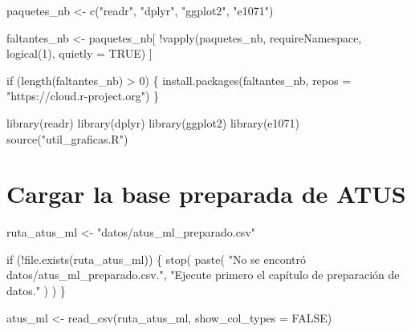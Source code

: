 \documentclass[
  spanish,
  10.5pt,
  letterpaper,
  openany,
  headings=big]{scrbook}
\newenvironment{Shaded}{}{}
\newcommand{\AttributeTok}[1]{\textcolor[rgb]{0.84,0.23,0.29}{#1}}
\newcommand{\ConstantTok}[1]{\textcolor[rgb]{0.00,0.36,0.77}{#1}}
\newcommand{\ControlFlowTok}[1]{\textcolor[rgb]{0.84,0.23,0.29}{#1}}
\newcommand{\DecValTok}[1]{\textcolor[rgb]{0.00,0.36,0.77}{#1}}
\newcommand{\FunctionTok}[1]{\textcolor[rgb]{0.44,0.26,0.76}{#1}}
\newcommand{\NormalTok}[1]{\textcolor[rgb]{0.14,0.16,0.18}{#1}}
\newcommand{\OtherTok}[1]{\textcolor[rgb]{0.44,0.26,0.76}{#1}}
\newcommand{\SpecialCharTok}[1]{\textcolor[rgb]{0.00,0.36,0.77}{#1}}
\newcommand{\StringTok}[1]{\textcolor[rgb]{0.01,0.18,0.38}{#1}}
\begin{document}
\begin{Shaded}
\begin{Highlighting}[]
\NormalTok{paquetes\_nb }\OtherTok{\textless{}{-}} \FunctionTok{c}\NormalTok{(}\StringTok{"readr"}\NormalTok{, }\StringTok{"dplyr"}\NormalTok{, }\StringTok{"ggplot2"}\NormalTok{, }\StringTok{"e1071"}\NormalTok{)}

\NormalTok{faltantes\_nb }\OtherTok{\textless{}{-}}\NormalTok{ paquetes\_nb[}
  \SpecialCharTok{!}\FunctionTok{vapply}\NormalTok{(paquetes\_nb, requireNamespace, }\FunctionTok{logical}\NormalTok{(}\DecValTok{1}\NormalTok{), }\AttributeTok{quietly =} \ConstantTok{TRUE}\NormalTok{)}
\NormalTok{]}

\ControlFlowTok{if}\NormalTok{ (}\FunctionTok{length}\NormalTok{(faltantes\_nb) }\SpecialCharTok{\textgreater{}} \DecValTok{0}\NormalTok{) \{}
  \FunctionTok{install.packages}\NormalTok{(faltantes\_nb, }\AttributeTok{repos =} \StringTok{"https://cloud.r{-}project.org"}\NormalTok{)}
\NormalTok{\}}

\FunctionTok{library}\NormalTok{(readr)}
\FunctionTok{library}\NormalTok{(dplyr)}
\FunctionTok{library}\NormalTok{(ggplot2)}
\FunctionTok{library}\NormalTok{(e1071)}
\FunctionTok{source}\NormalTok{(}\StringTok{"util\_graficas.R"}\NormalTok{)}
\end{Highlighting}
\end{Shaded}

\section{Cargar la base preparada de
ATUS}\label{cargar-la-base-preparada-de-atus}

\begin{Shaded}
\begin{Highlighting}[]
\NormalTok{ruta\_atus\_ml }\OtherTok{\textless{}{-}} \StringTok{"datos/atus\_ml\_preparado.csv"}

\ControlFlowTok{if}\NormalTok{ (}\SpecialCharTok{!}\FunctionTok{file.exists}\NormalTok{(ruta\_atus\_ml)) \{}
  \FunctionTok{stop}\NormalTok{(}
    \FunctionTok{paste}\NormalTok{(}
      \StringTok{"No se encontró datos/atus\_ml\_preparado.csv."}\NormalTok{,}
      \StringTok{"Ejecute primero el capítulo de preparación de datos."}
\NormalTok{    )}
\NormalTok{  )}
\NormalTok{\}}

\NormalTok{atus\_ml }\OtherTok{\textless{}{-}} \FunctionTok{read\_csv}\NormalTok{(ruta\_atus\_ml, }\AttributeTok{show\_col\_types =} \ConstantTok{FALSE}\NormalTok{)}
\end{Highlighting}
\end{Shaded}
\end{document}
